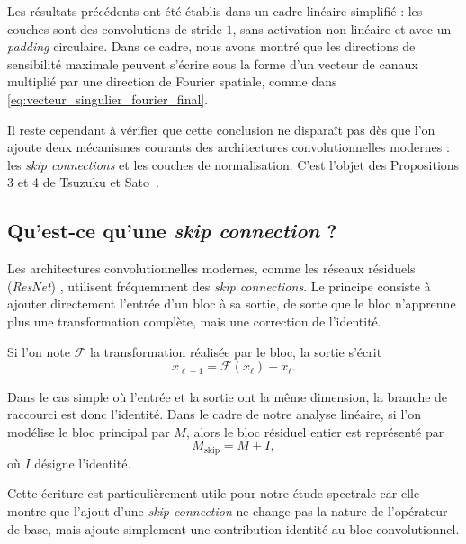 Les résultats précédents ont été établis dans un cadre linéaire simplifié : les couches sont des convolutions
de stride $1$, sans activation non linéaire et avec un \textit{padding} circulaire. Dans ce cadre, nous avons montré que les directions de sensibilité maximale peuvent s'écrire sous la forme
d'un vecteur de canaux multiplié par une direction de Fourier spatiale, comme dans
\eqref{eq:vecteur_singulier_fourier_final}.

Il reste cependant à vérifier que cette conclusion ne disparaît pas dès que l'on ajoute deux mécanismes courants
des architectures convolutionnelles modernes : les \textit{skip connections} et les couches de normalisation. C'est
l'objet des Propositions 3 et 4 de Tsuzuku et Sato~\cite{tsuzuku2019structural}.

\subsection{Qu'est-ce qu'une \textit{skip connection} ?}

Les architectures convolutionnelles modernes, comme les réseaux résiduels (\textit{ResNet}) \cite{he2016deep}, 
utilisent fréquemment des \textit{skip connections}. 
Le principe consiste à ajouter directement l'entrée d'un bloc à sa sortie, de sorte que le bloc n'apprenne plus 
une transformation complète, mais une correction de l'identité.

Si l'on note $\mathcal{F}$ la transformation réalisée par le bloc, la sortie s'écrit
\begin{equation}
    x_{\ell+1} = \mathcal{F}(x_\ell) + x_\ell.
\end{equation}

Dans le cas simple où l'entrée et la sortie ont la même dimension, la branche de raccourci est donc l'identité. 
Dans le cadre de notre analyse linéaire, si l'on modélise le bloc principal par $M$, 
alors le bloc résiduel entier est représenté par
\begin{equation}
    M_{\mathrm{skip}} = M + I,
    \label{eq:skip_connection_matricielle}
\end{equation}
où $I$ désigne l'identité.

Cette écriture est particulièrement utile pour notre étude spectrale car elle montre que l'ajout d'une 
\textit{skip connection} ne change pas la nature de l'opérateur de base, mais ajoute simplement une contribution 
identité au bloc convolutionnel.

